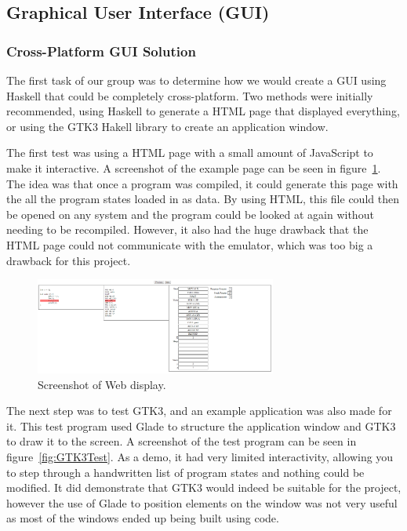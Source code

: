 \documentclass[10point]{article}
\begin{document}
\subsection{Graphical User Interface (GUI)}
\subsubsection{Cross-Platform GUI Solution}
The first task of our group was to determine how we would create a GUI using Haskell that could be completely cross-platform. Two methods were initially recommended, using Haskell to generate a HTML page that displayed everything, or using the GTK3 Hakell library to create an application window.

The first test was using a HTML page with a small amount of JavaScript to make it interactive. A screenshot of the example page can be seen in figure~\ref{fig:WebTest}. The idea was that once a program was compiled, it could generate this page with the all the program states loaded in as data. By using HTML, this file could then be opened on any system and the program could be looked at again without needing to be recompiled. However, it also had the huge drawback that the HTML page could not communicate with the emulator, which was too big a drawback for this project.

\begin{figure}[h]
\centering
\includegraphics[width=300px]{WebScreenshot}
\caption{Screenshot of Web display.}
\label{fig:WebTest}
\end{figure}

The next step was to test GTK3, and an example application was also made for it. This test program used Glade to structure the application window and GTK3 to draw it to the screen. A screenshot of the test program can be seen in figure~\ref{fig:GTK3Test}. As a demo, it had very limited interactivity, allowing you to  step through a handwritten list of program states and nothing could be modified. It did demonstrate that GTK3 would indeed be suitable for the project, however the use of Glade to position elements on the window was not very useful as most of the windows ended up being built using code.
\end{document}
